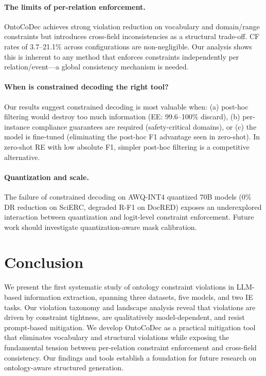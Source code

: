 \documentclass[11pt]{article}
\newcommand{\sys}{OntoCoDec}
\begin{document}
\paragraph{The limits of per-relation enforcement.}
\sys{} achieves strong violation reduction on vocabulary and domain/range constraints but introduces cross-field inconsistencies as a structural trade-off.
CF rates of 3.7--21.1\% across configurations are non-negligible.
Our analysis shows this is inherent to any method that enforces constraints independently per relation/event---a global consistency mechanism is needed.

\paragraph{When is constrained decoding the right tool?}
Our results suggest constrained decoding is most valuable when: (a) post-hoc filtering would destroy too much information (EE: 99.6--100\% discard), (b) per-instance compliance guarantees are required (safety-critical domains), or (c) the model is fine-tuned (eliminating the post-hoc F1 advantage seen in zero-shot).
In zero-shot RE with low absolute F1, simpler post-hoc filtering is a competitive alternative.

\paragraph{Quantization and scale.}
The failure of constrained decoding on AWQ-INT4 quantized 70B models (0\% DR reduction on SciERC, degraded R-F1 on DocRED) exposes an underexplored interaction between quantization and logit-level constraint enforcement.
Future work should investigate quantization-aware mask calibration.

\section{Conclusion}
\label{sec:conclusion}

We present the first systematic study of ontology constraint violations in LLM-based information extraction, spanning three datasets, five models, and two IE tasks.
Our violation taxonomy and landscape analysis reveal that violations are driven by constraint tightness, are qualitatively model-dependent, and resist prompt-based mitigation.
We develop \sys{} as a practical mitigation tool that eliminates vocabulary and structural violations while exposing the fundamental tension between per-relation constraint enforcement and cross-field consistency.
Our findings and tools establish a foundation for future research on ontology-aware structured generation.
\end{document}
